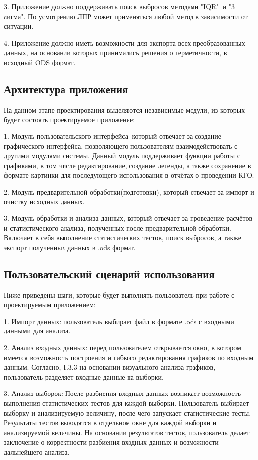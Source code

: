 3. Приложение должно поддерживать поиск выбросов методами "IQR"\ и "3 cигма". По усмотрению ЛПР может применяться любой метод в зависимости от ситуации.

4. Приложение должно иметь возможности для экспорта всех преобразованных
данных, на основании которых принимались решения о герметичности, в
исходный ODS формат.

\subsection{Архитектура приложения}

На данном этапе проектирования выделяются независимые модули, из которых будет состоять проектируемое приложение:

1. Модуль пользовательского интерфейса, который отвечает за создание
графического интерфейса, позволяющего пользователям взаимодействовать с другими модулями системы. Данный модуль поддерживает функции работы с графиками, в том числе редактирование, создание легенды, а также сохранение в формате картинки для последующего использования в отчётах о проведении КГО.

2. Модуль предварительной обработки(подготовки), который
отвечает за импорт и очистку исходных данных.

3. Модуль обработки и анализа данных, который отвечает за проведение
расчётов и статистического анализа, полученных после предварительной
обработки. Включает в себя выполнение статистических тестов, поиск выбросов, а также экспорт полученных данных в .ods формат.

\subsection{Пользовательский сценарий использования}

Ниже приведены шаги, которые будет выполнять пользователь при работе с проектируемым приложением:

1. Импорт данных: пользователь выбирает файл в формате .ods с входными данными для анализа.

2. Анализ входных данных: перед пользователем открывается окно, в котором имеется возможность построения и гибкого редактирования графиков по входным данным. Согласно, 1.3.3 на основании визуального анализа графиков, пользователь разделяет входные данные на выборки.

3. Анализ выборок: После разбиения входных данных возникает возможность выполнения статистических тестов для каждой выборки. Пользователь выбирает выборку и анализируемую величину, после чего запускает статистические тесты. Результаты тестов выводятся в отдельном окне для каждой выборки и анализируемой величины. На основании результатов тестов, пользователь делает заключение о корректности разбиения входных данных и возможности дальнейшего анализа.

